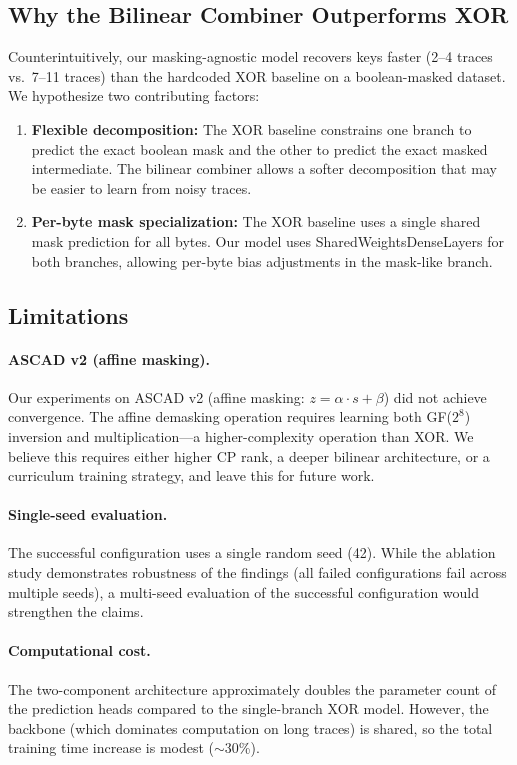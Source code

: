 \documentclass[submission]{iacrtrans}
\begin{document}
\subsection{Why the Bilinear Combiner Outperforms XOR}

Counterintuitively, our masking-agnostic model recovers keys faster (2--4 traces vs.\ 7--11 traces) than the hardcoded XOR baseline on a boolean-masked dataset. We hypothesize two contributing factors:
\begin{enumerate}[leftmargin=*]
  \item \textbf{Flexible decomposition:} The XOR baseline constrains one branch to predict the exact boolean mask and the other to predict the exact masked intermediate. The bilinear combiner allows a softer decomposition that may be easier to learn from noisy traces.
  \item \textbf{Per-byte mask specialization:} The XOR baseline uses a single shared mask prediction for all bytes. Our model uses SharedWeightsDenseLayers for both branches, allowing per-byte bias adjustments in the mask-like branch.
\end{enumerate}

\subsection{Limitations}

\paragraph{ASCAD v2 (affine masking).} Our experiments on ASCAD v2 (affine masking: $z = \alpha \cdot s + \beta$) did not achieve convergence. The affine demasking operation requires learning both GF($2^8$) inversion and multiplication---a higher-complexity operation than XOR. We believe this requires either higher CP rank, a deeper bilinear architecture, or a curriculum training strategy, and leave this for future work.

\paragraph{Single-seed evaluation.} The successful configuration uses a single random seed (42). While the ablation study demonstrates robustness of the findings (all failed configurations fail across multiple seeds), a multi-seed evaluation of the successful configuration would strengthen the claims.

\paragraph{Computational cost.} The two-component architecture approximately doubles the parameter count of the prediction heads compared to the single-branch XOR model. However, the backbone (which dominates computation on long traces) is shared, so the total training time increase is modest ($\sim$30\%).
\end{document}
